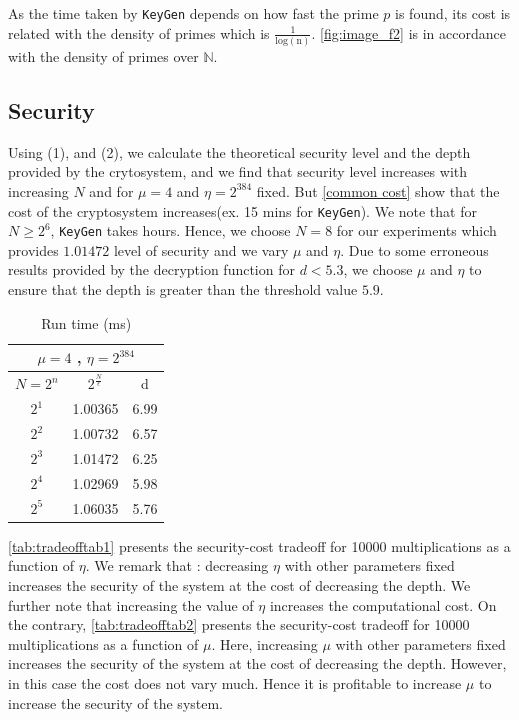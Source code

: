\documentclass{acm_proc_article-sp}
\begin{document}
As the time taken by \texttt{KeyGen} depends on how fast the prime $p$ is found, its cost is related with the density of primes which is $\frac{1}{\mathrm{log(n)}}$. \autoref{fig:image_f2} is in accordance with the density of primes over $\mathbb{N}$.

\subsection{Security }

Using (1), and (2), we calculate the theoretical security level and the depth provided by the crytosystem, and we find that security level increases with increasing $N$ and for $\mu =4$ and $\eta=2^{384}$ fixed. But \autoref{common cost} show that the cost of the cryptosystem increases(ex. 15 mins for \texttt{KeyGen}). We note that for $N \geq 2^6$, \texttt{KeyGen} takes hours. Hence, we choose $N=8$ for our experiments which provides $1.01472$ level of security and we vary $\mu$ and $\eta$. Due to some erroneous results provided by the decryption function for $d<5.3$, we choose $\mu$ and $\eta$ to ensure that the depth is greater than the threshold value $5.9$.



\begin{table}[htb]
  \centering
  \caption{Run time (ms)}
\begin{tabular}{|c|c|c||}
  \hline
  \multicolumn{3}{|c||}{$\mu = 4$ , $\eta = 2^{384}$} \\
  \hline
  $N=2^{n}$ &  $2^{\frac{N}{\epsilon}}$ & d \\
  \hline
  $2^{1}$ &  1.00365 & 6.99 \\
  $2^{2}$ &  1.00732 & 6.57\\
  $2^{3}$ &  1.01472 & 6.25\\
  $2^{4}$ &  1.02969 & 5.98\\
  $2^{5}$ & 1.06035 & 5.76\\
  \hline
\end{tabular}
\normalsize
\label{tab:securitytab}
\end{table}

\autoref{tab:tradeofftab1} presents the security-cost tradeoff for 10000 multiplications as a function of $\eta$. We remark that : decreasing $\eta$ with other parameters fixed increases the security of the system at the cost of decreasing the depth.  We further note that increasing the value of $\eta$ increases the computational cost. On the contrary, \autoref{tab:tradeofftab2} presents the security-cost tradeoff for 10000 multiplications as a function of $\mu$. Here, increasing $\mu$ with other parameters fixed increases the security of the system at the cost of decreasing the depth. However, in this case the cost does not vary much. Hence it is profitable to increase $\mu$ to increase the security of the system.
\end{document}
